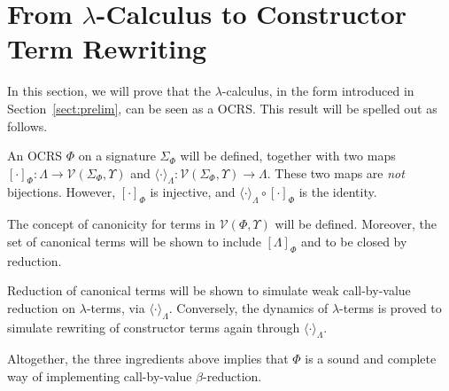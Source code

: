 \documentclass{LMCS}
\newcommand{\LambdatoTRS}[1]{[#1]_{\Phi}}
\newcommand{\TRStolambda}[1]{\langle{#1}\rangle_{\Lambdaterms}}
\newcommand{\Variables}{\Upsilon}
\newcommand{\Lambdaterms}{\Lambda}
\newcommand{\Functions}[1]{\Sigma_{#1}}
\newcommand{\TRS}{\Phi}
\newcommand{\TRSvartermsp}[1]{\mathcal{V}(#1,\Variables)}
\newenvironment{varitemize}
{
\begin{list}{\labelitemi}
{\setlength{\itemsep}{0.0mm}
 \setlength{\topsep}{0.0mm}
 \setlength{\parindent}{0.0mm}
 \setlength{\parskip}{0.0mm}
 \setlength{\parsep}{0.0mm}
 \setlength{\partopsep}{0.0mm}
 \setlength{\leftmargin}{15pt}
 \setlength{\labelsep}{5pt}
 \setlength{\labelwidth}{10pt}}}
{
 \end{list} 
}
\begin{document}
\section{From $\lambda$-Calculus to Constructor Term Rewriting}\label{sect:CRS}
In this section, we will prove that the $\lambda$-calculus, in the form introduced 
in Section~\ref{sect:prelim}, can be seen as a OCRS. This result will be spelled
out as follows.
\begin{varitemize}
\item
  An OCRS $\TRS$ on a signature $\Functions{\TRS}$ will be defined, together with two maps
  $\LambdatoTRS{\cdot}:\Lambdaterms\rightarrow\TRSvartermsp{\Functions{\TRS}}$ and
  $\TRStolambda{\cdot}:\TRSvartermsp{\Functions{\TRS}}\rightarrow\Lambdaterms$.
  These two maps are \emph{not} bijections. However, $\LambdatoTRS{\cdot}$
  is injective, and $\TRStolambda{\cdot}\circ\LambdatoTRS{\cdot}$ is the identity.
\item
  The concept of canonicity for terms in $\TRSvartermsp{\TRS}$ will be defined. Moreover,
  the set of canonical terms will be shown to include $\LambdatoTRS{\Lambdaterms}$
  and to be closed by reduction.
\item
  Reduction of canonical terms will be shown to simulate weak call-by-value reduction
  on $\lambda$-terms, via $\TRStolambda{\cdot}$. Conversely, the dynamics of
  $\lambda$-terms is proved to simulate rewriting of constructor terms again through
  $\TRStolambda{\cdot}$.
\end{varitemize}
Altogether, the three ingredients above implies that $\TRS$ is a sound and complete
way of implementing call-by-value $\beta$-reduction.
\end{document}
